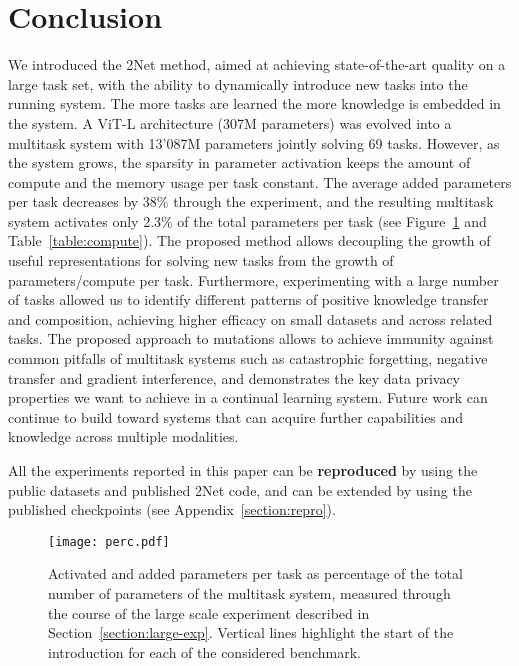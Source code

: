 \documentclass{article} \usepackage{iclr2023_conference,times}
\newcommand{\muNet}{2Net\xspace}
\begin{document}
\section{Conclusion}
\label{section:conclusions}

We introduced the \muNet method,
aimed at achieving state-of-the-art quality on a large task set, with the ability to dynamically introduce new tasks into the running system. The more tasks are learned the more knowledge is embedded in the system. A ViT-L architecture (307M parameters) was evolved into a multitask system with 13'087M parameters jointly solving 69 tasks.
However, as the system grows,
the sparsity in parameter activation keeps the amount of compute and the memory usage per task constant.
The average added parameters per task decreases by 38\% through the experiment, and the resulting multitask system activates only 2.3\% of the total parameters per task (see Figure~\ref{fig:perc} and Table~\ref{table:compute}).
The proposed method allows decoupling the growth of useful representations for solving new tasks from the growth of parameters/compute per task.
Furthermore, experimenting with a large number of tasks allowed
us to identify different patterns of positive knowledge transfer and composition, achieving higher efficacy on small datasets and across related tasks.
The proposed approach to mutations allows to achieve immunity against common pitfalls of multitask systems such as catastrophic forgetting, negative transfer and gradient interference, and demonstrates the key data privacy properties we want to achieve in a continual learning system.
Future work can continue to build toward systems that can acquire further capabilities and knowledge across multiple modalities.

All the experiments reported in this paper can be \textbf{reproduced} by using the public datasets and published 2Net code, and can be extended by using the published checkpoints (see Appendix~\ref{section:repro}).





\begin{figure}[t]
\vspace{-10pt}
\centering
\texttt{[image: perc.pdf]}
\vspace{-18pt}
\caption{
Activated and added parameters per task as percentage of the total number of parameters of the multitask system, measured through the course of the large scale experiment described in Section~\ref{section:large-exp}. Vertical lines highlight the start of the introduction for each of the considered benchmark.
}
\label{fig:perc}
\vspace{-10pt}
\end{figure}
\end{document}
